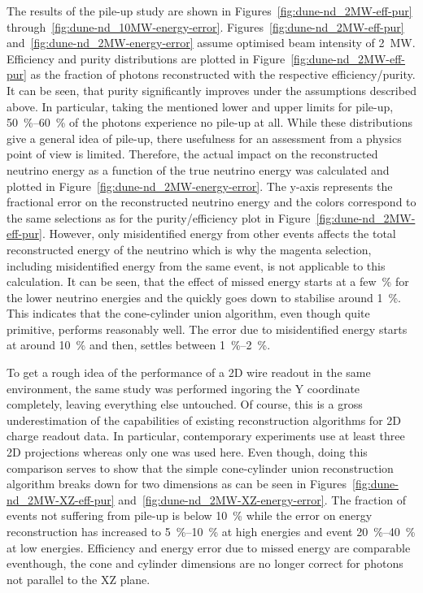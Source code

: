 The results of the pile-up study are shown in Figures~\ref{fig:dune-nd_2MW-eff-pur} through~\ref{fig:dune-nd_10MW-energy-error}.
Figures~\ref{fig:dune-nd_2MW-eff-pur} and~\ref{fig:dune-nd_2MW-energy-error} assume optimised beam intensity of \SI{2}{\mega\watt}.
Efficiency and purity distributions are plotted in Figure~\ref{fig:dune-nd_2MW-eff-pur} as the fraction of \Pgpz photons reconstructed with the respective efficiency/purity.
It can be seen, that purity significantly improves under the assumptions described above.
In particular, taking the mentioned lower and upper limits for pile-up, \SIrange{50}{60}{\percent} of the photons experience no pile-up at all.
While these distributions give a general idea of pile-up, there usefulness for an assessment from a physics point of view is limited.
Therefore, the actual impact on the reconstructed neutrino energy as a function of the true neutrino energy was calculated and plotted in Figure~\ref{fig:dune-nd_2MW-energy-error}.
The y-axis represents the fractional error on the reconstructed neutrino energy and the colors correspond to the same selections as for the purity/efficiency plot in Figure~\ref{fig:dune-nd_2MW-eff-pur}.
However, only misidentified energy from other events affects the total reconstructed energy of the neutrino which is why the magenta selection, including misidentified energy from the same event, is not applicable to this calculation.
It can be seen, that the effect of missed energy starts at a few~\si{\percent} for the lower neutrino energies and the quickly goes down to stabilise around \SI{1}{\percent}.
This indicates that the cone-cylinder union algorithm, even though quite primitive, performs reasonably well.
The error due to misidentified energy starts at around \SI{10}{\percent} and then, settles between \SIrange{1}{2}{\percent}.

To get a rough idea of the performance of a 2D wire readout in the same environment, the same study was performed ingoring the Y coordinate completely, leaving everything else untouched.
Of course, this is a gross underestimation of the capabilities of existing reconstruction algorithms for 2D charge readout data.
In particular, contemporary experiments use at least three 2D projections whereas only one was used here.
Even though, doing this comparison serves to show that the simple cone-cylinder union reconstruction algorithm breaks down for two dimensions as can be seen in Figures~\ref{fig:dune-nd_2MW-XZ-eff-pur} and~\ref{fig:dune-nd_2MW-XZ-energy-error}.
The fraction of events not suffering from pile-up is below \SI{10}{\percent} while the error on energy reconstruction has increased to \SIrange{5}{10}{\percent} at high energies and event \SIrange{20}{40}{\percent} at low energies.
Efficiency and energy error due to missed energy are comparable eventhough, the cone and cylinder dimensions are no longer correct for photons not parallel to the XZ plane.

